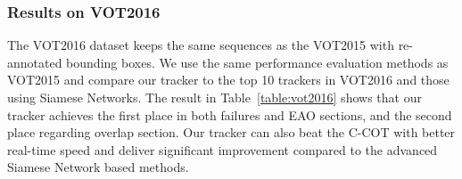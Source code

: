 \documentclass[runningheads]{llncs}
\begin{document}
\subsubsection{Results on VOT2016}

The VOT2016 dataset keeps the same sequences as the VOT2015 with re-annotated bounding boxes. We use the same performance evaluation methods as VOT2015 and compare our tracker to the top 10 trackers in VOT2016 and those using Siamese Networks. The result in Table~\ref{table:vot2016} shows that our tracker achieves the first place in both failures and EAO sections, and the second place regarding overlap section. Our tracker can also beat the C-COT with better real-time speed and deliver significant improvement compared to the advanced Siamese Network based methods.

\setlength{\tabcolsep}{20pt}
\end{document}
